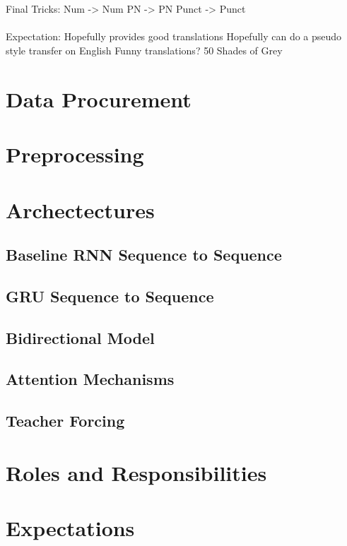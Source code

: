 \documentclass[twoside,twocolumn]{article}
\begin{document}
\\\\
Final Tricks:
	Num -> Num
	PN -> PN
	Punct -> Punct
\\\\
Expectation:
	Hopefully provides good translations
	Hopefully can do a pseudo style transfer on English
	Funny translations? 50 Shades of Grey
\section{Data Procurement}

\section{Preprocessing}

\section{Archectectures}

\subsection{Baseline RNN Sequence to Sequence}

\subsection{GRU Sequence to Sequence}

\subsection{Bidirectional Model}

\subsection{Attention Mechanisms}

\subsection{Teacher Forcing}

\section{Roles and Responsibilities}

\section{Expectations}



\end{document}
